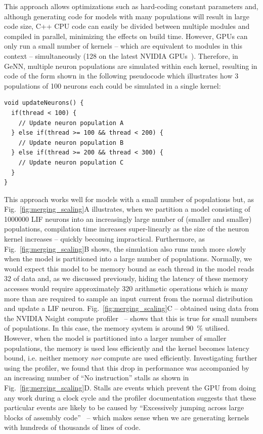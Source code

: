 \documentclass[9pt,twocolumn,twoside,lineno]{pnas-new}
\newcommand{\todo}[1]{\textbf{\textsc{\textcolor{red}{(TODO: #1)}}}}
\begin{document}
This approach allows optimizations such as hard-coding constant parameters and, although generating code for models with many populations will result in large code size, C++ CPU code can easily be divided between multiple modules and compiled in parallel, minimizing the effects on build time.
However, GPUs can only run a small number of kernels -- which are equivalent to modules in this context --  simultaneously (128 on the latest NVIDIA GPUs~\citep[p278]{NVIDIACorporation2019}).
Therefore, in GeNN, multiple neuron populations are simulated within each kernel, resulting in code of the form shown in the following pseudocode which illustrates how 3 populations of 100 neurons each could be simulated in a single kernel:
%
\begin{lstlisting}
void updateNeurons() {
  if(thread < 100) {
    // Update neuron population A
  } else if(thread >= 100 && thread < 200) {
    // Update neuron population B
  } else if(thread >= 200 && thread < 300) {
    // Update neuron population C
  }
}
\end{lstlisting}
%
This approach works well for models with a small number of populations but, as Fig.~\ref{fig:merging_scaling}A illustrates, when we partition a model consisting of \num{1000000} LIF neurons into an increasingly large number of (smaller and smaller) populations, compilation time increases super-linearly as the size of the neuron kernel increases -- quickly becoming impractical.
Furthermore, as Fig.~\ref{fig:merging_scaling}B shows, the simulation also runs much more slowly when the model is partitioned into a large number of populations.
Normally, we would expect this model to be memory bound as each thread in the model reads \SI{32}{\byte} of data and, as we discussed previously, hiding the latency of these memory accesses would require approximately 320 arithmetic operations which is many more than are required to sample an input current from the normal distribution and update a LIF neuron.
Fig.~\ref{fig:merging_scaling}C -- obtained using data from the NVIDIA Nsight compute profiler~\citep{NVIDIACorporation2020} -- shows that this is true for small numbers of populations.
In this case, the memory system is around \SI{90}{\percent} utilised.
However, when the model is partitioned into a larger number of smaller populations, the memory is used less efficiently and the kernel becomes latency bound, i.e. neither memory \emph{nor} compute are used efficiently.
Investigating further using the profiler, we found that this drop in performance was accompanied by an increasing number of ``No instruction'' stalls as shown in Fig.~\ref{fig:merging_scaling}D.
Stalls are events which prevent the GPU from doing any work during a clock cycle and the profiler documentation suggests that these particular events are likely to be caused by ``Excessively jumping across large blocks of assembly code''~\citep[p47]{NVIDIACorporation2020} -- which makes sense when we are generating kernels with hundreds of thousands of lines of code.
\end{document}
